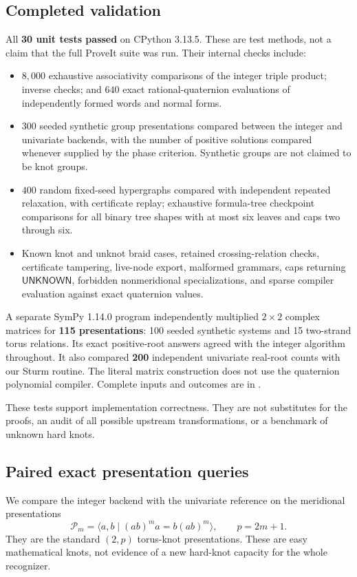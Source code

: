 \documentclass[11pt]{article}
\theoremstyle{definition}
\theoremstyle{remark}
\newcommand{\UN}{\mathsf{UNKNOWN}}
\newcommand{\calP}{\mathcal P}
\begin{document}
\subsection{Completed validation}
All \textbf{30 unit tests passed} on CPython 3.13.5. These are test methods, not a claim that the full ProveIt suite was run. Their internal checks include:
\begin{itemize}
\item $8{,}000$ exhaustive associativity comparisons of the integer triple product; inverse checks; and $640$ exact rational-quaternion evaluations of independently formed words and normal forms.
\item $300$ seeded synthetic group presentations compared between the integer and univariate backends, with the number of positive solutions compared whenever supplied by the phase criterion. Synthetic groups are not claimed to be knot groups.
\item $400$ random fixed-seed hypergraphs compared with independent repeated relaxation, with certificate replay; exhaustive formula-tree checkpoint comparisons for all binary tree shapes with at most six leaves and caps two through six.
\item Known knot and unknot braid cases, retained crossing-relation checks, certificate tampering, live-node export, malformed grammars, caps returning $\UN$, forbidden nonmeridional specializations, and sparse compiler evaluation against exact quaternion values.
\end{itemize}

A separate SymPy 1.14.0 program independently multiplied $2\times2$ complex matrices for \textbf{115 presentations}: 100 seeded synthetic systems and 15 two-strand torus relations. Its exact positive-root answers agreed with the integer algorithm throughout. It also compared \textbf{200} independent univariate real-root counts with our Sturm routine. The literal matrix construction does not use the quaternion polynomial compiler. Complete inputs and outcomes are in .

These tests support implementation correctness. They are not substitutes for the proofs, an audit of all possible upstream transformations, or a benchmark of unknown hard knots.

\subsection{Paired exact presentation queries}
We compare the integer backend with the univariate reference on the meridional presentations
\begin{equation}
\calP_m=\langle a,b\mid (ab)^m a=b(ab)^m\rangle,
\qquad p=2m+1.
\label{eq:torusfamily}
\end{equation}
They are the standard $(2,p)$ torus-knot presentations. These are easy mathematical knots, not evidence of a new hard-knot capacity for the whole recognizer.
\end{document}
